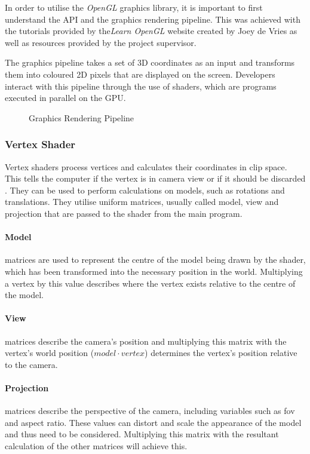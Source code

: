 \documentclass[12pt]{article}
\newcommand{\wideimage}[2][]{%
  \makebox[\textwidth][c]{\texttt{[image: \#2]}}%
}
\begin{document}
    In order to utilise the \textit{OpenGL} graphics library\cite{opengl}, it is important to first understand the API and the graphics rendering pipeline. This was achieved with the tutorials provided by the\textit{Learn OpenGL} website created by Joey de Vries\cite{learnopengl} as well as resources provided by the project supervisor.

    The graphics pipeline takes a set of 3D coordinates as an input and transforms them into coloured 2D pixels that are displayed on the screen. Developers interact with this pipeline through the use of shaders, which are programs executed in parallel on the GPU.

    \begin{figure}[H]
        \wideimage[]{graphicsPipeline.png}
        \caption{Graphics Rendering Pipeline \cite{learnopengl}}
    \end{figure}

    \subsubsection{Vertex Shader}

    Vertex shaders process vertices and calculates their coordinates in clip space. This tells the computer if the vertex is in camera view or if it should be discarded \cite{shadertutorial}. They can be used to perform calculations on models, such as rotations and translations. They utilise uniform matrices, usually called model, view and projection that are passed to the shader from the main program.

    \paragraph{Model}matrices are used to represent the centre of the model being drawn by the shader, which has been transformed into the necessary position in the world. Multiplying a vertex by this value describes where the vertex exists relative to the centre of the model.

    \paragraph{View}matrices describe the camera's position and multiplying this matrix with the vertex's world position ($model \cdot vertex$) determines the vertex's position relative to the camera.

    \paragraph{Projection}matrices describe the perspective of the camera, including variables such as fov and aspect ratio. These values can distort and scale the appearance of the model and thus need to be considered. Multiplying this matrix with the resultant calculation of the other matrices will achieve this.
\end{document}
